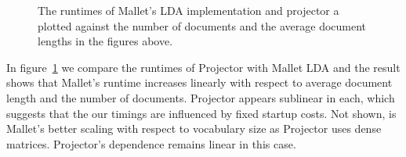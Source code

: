 \begin{figure}
\begin{center}

\end{center}
\caption{The runtimes of Mallet's LDA implementation and projector a plotted against
the number of documents and the average document lengths in the figures above. }
\label{fig:time-proj-mallet}
\end{figure}

In figure~\ref{fig:time-proj-mallet} we compare the runtimes of Projector with Mallet
LDA and the result shows that Mallet's runtime increases linearly with respect
to average document length and the number of documents.  Projector appears sublinear
in each, which suggests that the our timings are influenced by fixed
startup costs.  Not shown, is Mallet's better scaling with respect
to vocabulary size as Projector uses dense matrices.  Projector's dependence
remains linear in this case. 
